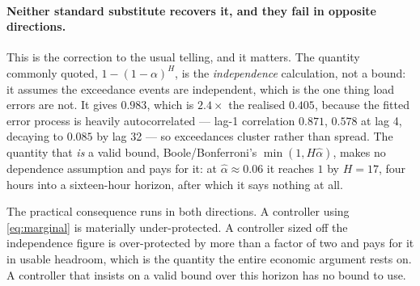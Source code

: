 \paragraph{Neither standard substitute recovers it, and they fail in opposite
directions.} This is the correction to the usual telling, and it matters. The
quantity commonly quoted, $1-(1-\alpha)^H$, is the \emph{independence}
calculation, not a bound: it assumes the exceedance events are independent,
which is the one thing load errors are not. It gives $0.983$, which is
$2.4\times$ the realised $0.405$, because the fitted error process is heavily
autocorrelated --- lag-1 correlation $0.871$, $0.578$ at lag 4, decaying to
$0.085$ by lag 32 --- so exceedances cluster rather than spread. The quantity
that \emph{is} a valid bound, Boole/Bonferroni's $\min(1, H\hat\alpha)$, makes
no dependence assumption and pays for it: at $\hat\alpha \approx 0.06$ it
reaches $1$ by $H=17$, four hours into a sixteen-hour horizon, after which it
says nothing at all.

The practical consequence runs in both directions. A controller using
\eqref{eq:marginal} is materially under-protected. A controller sized off the
independence figure is over-protected by more than a factor of two and pays for
it in usable headroom, which is the quantity the entire economic argument rests
on. A controller that insists on a valid bound over this horizon has no bound to
use.





